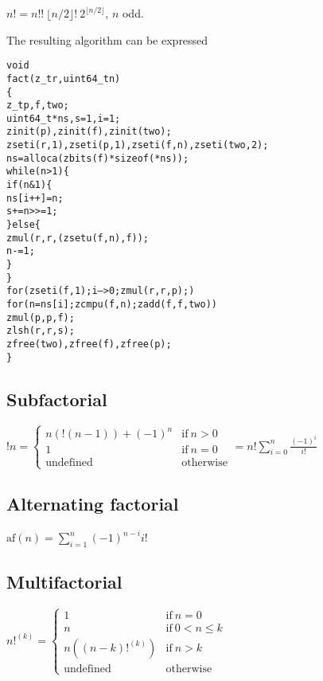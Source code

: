 \vspace{1em}
\( \displaystyle{
    n! = n!! ~ \lfloor n / 2 \rfloor! ~ 2^{\lfloor n / 2 \rfloor}
}\), $n$ odd.
\vspace{1em}

\noindent
The resulting algorithm can be expressed

\begin{alltt}
   void
   fact(z_t r, uint64_t n)
   \{
       z_t p, f, two;
       uint64_t *ns, s = 1, i = 1;
       zinit(p), zinit(f), zinit(two);
       zseti(r, 1), zseti(p, 1), zseti(f, n), zseti(two, 2);
       ns = alloca(zbits(f) * sizeof(*ns));
       while (n > 1) \{
           if (n & 1) \{
               ns[i++] = n;
               s += n >>= 1;
           \} else \{
               zmul(r, r, (zsetu(f, n), f));
               n -= 1;
           \}
       \}
       for (zseti(f, 1); i-- > 0; zmul(r, r, p);)
           for (n = ns[i]; zcmpu(f, n); zadd(f, f, two))
               zmul(p, p, f);
       zlsh(r, r, s);
       zfree(two), zfree(f), zfree(p);
   \}
\end{alltt}


\subsection{Subfactorial}
\label{sec:Subfactorial}

\( \displaystyle{
    !n = \left \lbrace \begin{array}{ll}
      n(!(n - 1)) + (-1)^n & \textrm{if}~ n > 0 \\
      1 & \textrm{if}~ n = 0 \\
      \textrm{undefined} & \textrm{otherwise}
    \end{array} \right . =
    n! \sum_{i = 0}^n \frac{(-1)^i}{i!}
}\)


\subsection{Alternating factorial}
\label{sec:Alternating factorial}

\( \displaystyle{
    \mbox{af}(n) = \sum_{i = 1}^n {(-1)^{n - i} i!}
}\)


\subsection{Multifactorial}
\label{sec:Multifactorial}

\( \displaystyle{
    n!^{(k)} = \left \lbrace \begin{array}{ll}
      1 & \textrm{if}~ n = 0 \\
      n & \textrm{if}~ 0 < n \le k \\
      n((n - k)!^{(k)}) & \textrm{if}~ n > k \\
      \textrm{undefined} & \textrm{otherwise}
    \end{array} \right .
}\)


